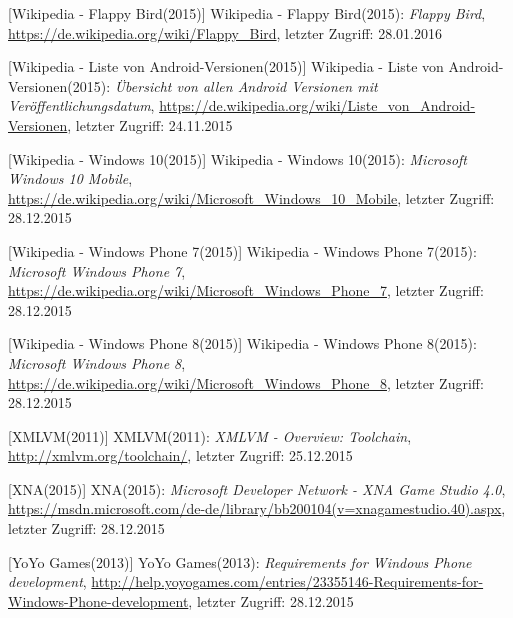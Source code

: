 \begin{thebibliography}{}
[Wikipedia - Flappy Bird(2015)] Wikipedia - Flappy Bird(2015): \emph{Flappy Bird},
\url{https://de.wikipedia.org/wiki/Flappy_Bird}, letzter Zugriff: 28.01.2016

[Wikipedia - Liste von Android-Versionen(2015)] Wikipedia - Liste von Android-Versionen(2015): \emph{Übersicht von allen Android Versionen mit Veröffentlichungsdatum},
\url{https://de.wikipedia.org/wiki/Liste_von_Android-Versionen}, letzter Zugriff: 24.11.2015

[Wikipedia - Windows 10(2015)] Wikipedia - Windows 10(2015): \emph{Microsoft Windows 10 Mobile},
\url{https://de.wikipedia.org/wiki/Microsoft_Windows_10_Mobile}, letzter Zugriff: 28.12.2015

[Wikipedia - Windows Phone 7(2015)] Wikipedia - Windows Phone 7(2015): \emph{Microsoft Windows Phone 7},
\url{https://de.wikipedia.org/wiki/Microsoft_Windows_Phone_7}, letzter Zugriff: 28.12.2015

[Wikipedia - Windows Phone 8(2015)] Wikipedia - Windows Phone 8(2015): \emph{Microsoft Windows Phone 8},
\url{https://de.wikipedia.org/wiki/Microsoft_Windows_Phone_8}, letzter Zugriff: 28.12.2015

[XMLVM(2011)] XMLVM(2011): \emph{XMLVM - Overview: Toolchain},
\url{http://xmlvm.org/toolchain/}, letzter Zugriff: 25.12.2015

[XNA(2015)] XNA(2015): \emph{Microsoft Developer Network - XNA Game Studio 4.0},
\url{https://msdn.microsoft.com/de-de/library/bb200104(v=xnagamestudio.40).aspx}, letzter Zugriff: 28.12.2015

[YoYo Games(2013)] YoYo Games(2013): \emph{Requirements for Windows Phone development},
\url{http://help.yoyogames.com/entries/23355146-Requirements-for-Windows-Phone-development}, letzter Zugriff: 28.12.2015


\end{thebibliography}
\clearpage\thispagestyle{empty}
\eigen  %
